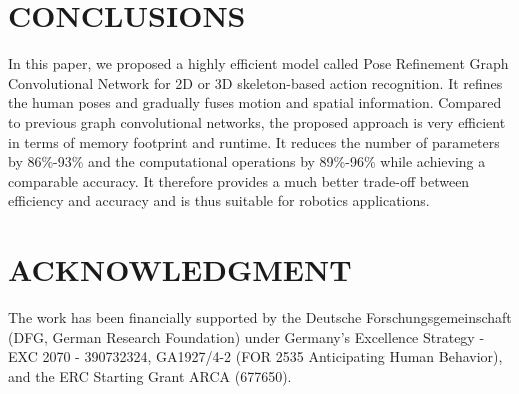 \documentclass[letterpaper, 10 pt, conference]{ieeeconf}
\begin{document}
\section{CONCLUSIONS}
\label{sec:conclusion}

In this paper, we proposed a highly efficient model called Pose Refinement Graph Convolutional Network for 2D or 3D skeleton-based action recognition. It refines the human poses and gradually fuses motion and spatial information. Compared to previous graph convolutional networks, the proposed approach is very efficient in terms of memory footprint and runtime. It reduces the number of parameters by 86\%-93\% and the computational operations by 89\%-96\% while achieving a comparable accuracy. It therefore provides a much better trade-off between efficiency and accuracy and is thus suitable for robotics applications.










\section*{ACKNOWLEDGMENT}

The work has been financially supported by the Deutsche Forschungsgemeinschaft (DFG, German Research Foundation) under Germany's Excellence Strategy - EXC 2070 - 390732324, GA1927/4-2 (FOR 2535 Anticipating Human Behavior), and the ERC Starting Grant ARCA (677650).





\end{document}
